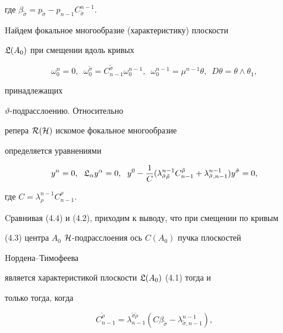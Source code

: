 где $\beta_{\tilde \sigma}=p_{\tilde\sigma}-p_{n-1} C^{n-1}_{\tilde\sigma}$.





Hайдем фокальное многообразие (характеристику) плоскости


$\frak L(A_0)$ при смещении вдоль кривых


\begin{equation}


\omega^n_0=0,\ \;


\omega^{\tilde \sigma}_0=C^{\tilde \sigma}_{n-1} \omega^{n-1}_0,\ \;


\omega^{n-1}_0=\mu^{n-1}\theta,\ \;


D\theta = \theta \wedge \theta_1,


\end{equation}


принадлежащих


$\vartheta$-подрасслоению. Относительно


репера $\cal R(\cal H)$ искомое фокальное многообразие


определяется уравнениями


\begin{equation}


y^n=0,\ \; \frak L_\alpha y^\alpha=0,\ \;


y^0- \frac1C (\lambda^{n-1}_{\tilde\sigma \tilde\rho}


C^{\tilde \rho}_{n-1}+\lambda^{n-1}_{\tilde\sigma, n-1}) y^{\tilde \sigma}=0,


\end{equation}


где $C=\lambda^{n-1}_{\rho} C^\rho_{n-1}$.





Cравнивая (4.4) и (4.2), приходим к выводу, что при смещении по кривым


(4.3) центра $A_0$\; $\cal H$-подрасслоения ось $C(A_0)$ пучка плоскостей


Hордена--Тимофеева


является характеристикой плоскости $\frak L(A_0)$ (4.1) тогда и


только тогда, когда


$$


C^{\tilde \rho}_{n-1} = \lambda^{\tilde\sigma \tilde\rho}_{n-1}


(C\beta_{\tilde\sigma}-\lambda^{n-1}_{\tilde\sigma,n-1}),


$$



